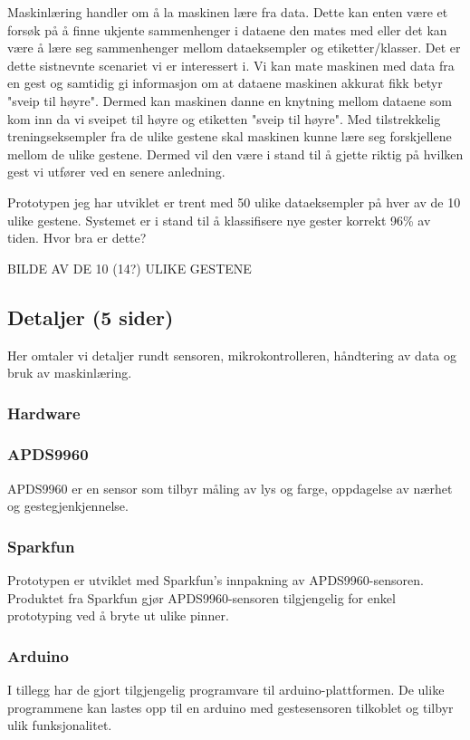 Maskinlæring handler om å la maskinen lære fra data. Dette kan enten være et forsøk på å finne ukjente sammenhenger i dataene den mates med eller det kan være å lære seg sammenhenger mellom dataeksempler og etiketter/klasser. Det er dette sistnevnte scenariet vi er interessert i. Vi kan mate maskinen med data fra en gest og samtidig gi informasjon om at dataene maskinen akkurat fikk betyr "sveip til høyre". Dermed kan maskinen danne en knytning mellom dataene som kom inn da vi sveipet til høyre og etiketten "sveip til høyre". Med tilstrekkelig treningseksempler fra de ulike gestene skal maskinen kunne lære seg forskjellene mellom de ulike gestene. Dermed vil den være i stand til å gjette riktig på hvilken gest vi utfører ved en senere anledning.

Prototypen jeg har utviklet er trent med 50 ulike dataeksempler på hver av de 10 ulike gestene. Systemet er i stand til å klassifisere nye gester korrekt 96\% av tiden. {\color{red} Hvor bra er dette?} 

{\color{red} BILDE AV DE 10 (14?) ULIKE GESTENE}


\subsection{Detaljer (5 sider)}
Her omtaler vi detaljer rundt sensoren, mikrokontrolleren, håndtering av data og bruk av maskinlæring.

\subsubsection{Hardware}

\subsubsection*{APDS9960}
APDS9960 er en sensor som tilbyr måling av lys og farge, oppdagelse av nærhet og gestegjenkjennelse.

\subsubsection*{Sparkfun}
Prototypen er utviklet med Sparkfun's innpakning av APDS9960-sensoren. Produktet fra Sparkfun gjør APDS9960-sensoren tilgjengelig for enkel prototyping ved å bryte ut ulike pinner.

\subsubsection*{Arduino}
I tillegg har de gjort tilgjengelig programvare til arduino-plattformen. De ulike programmene kan lastes opp til en arduino med gestesensoren tilkoblet og tilbyr ulik funksjonalitet. 

